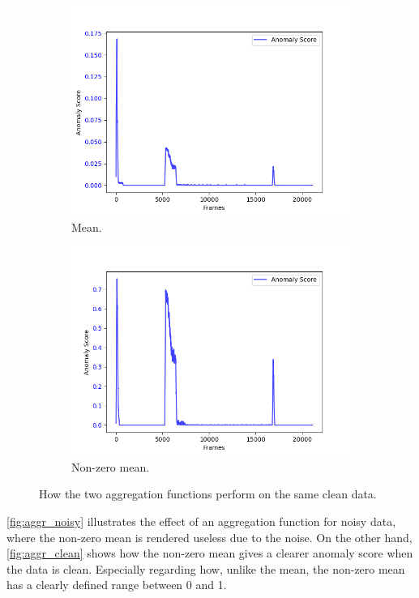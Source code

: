\begin{figure}[H]
    \centering
    \begin{subfigure}[t]{0.5\textwidth}
        \centering
        \includegraphics[width=\textwidth]{resources/methodology/aggr_clean_mean.png}
        \caption{Mean.}

    \end{subfigure}%
    \begin{subfigure}[t]{0.5\textwidth}
        \centering
        \includegraphics[width=\textwidth]{resources/methodology/aggr_clean_nzmean.png}
        \caption{Non-zero mean.}
    \end{subfigure}
    \caption{How the two aggregation functions perform on the same clean data.}
    \label{fig:aggr_clean}
\end{figure}
\autoref{fig:aggr_noisy} illustrates the effect of an aggregation function for noisy data, where the non-zero mean is rendered useless due to the noise. On the other hand, \autoref{fig:aggr_clean} shows how the non-zero mean gives a clearer anomaly score when the data is clean. Especially regarding how, unlike the mean, the non-zero mean has a clearly defined range between 0 and 1.
